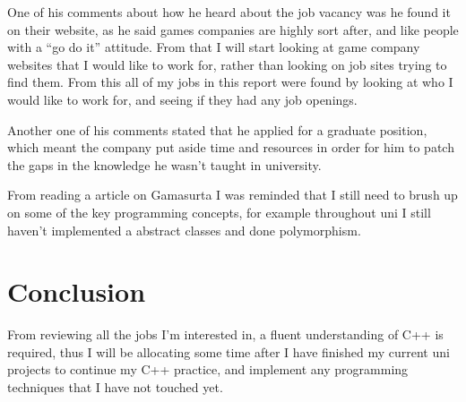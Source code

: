 \documentclass{scrartcl}
\begin{document}
One of his comments about how he heard about the job vacancy was he found it on their website, as he said games companies are highly sort after, and like people with a ``go do it'' attitude.
From that I will start looking at game company websites that I would like to work for, rather than looking on job sites trying to find them. 
From this all of my jobs in this report were found by looking at who I would like to work for, and seeing if they had any job openings.

Another one of his comments stated that he applied for a graduate position, which meant the company put aside time and resources in order for him to patch the gaps in the knowledge he wasn't taught in university.


From reading a article on Gamasurta \cite{programmerAdvice} I was reminded that I still need to brush up on some of the key programming concepts, for example throughout uni I still haven't implemented a abstract classes and done polymorphism.


\section{Conclusion}

From reviewing all the jobs I'm interested in, a fluent understanding of C++ is required, thus I will be allocating some time after I have finished my current uni projects to continue my C++ practice, and implement any programming techniques that I have not touched yet.
\end{document}
